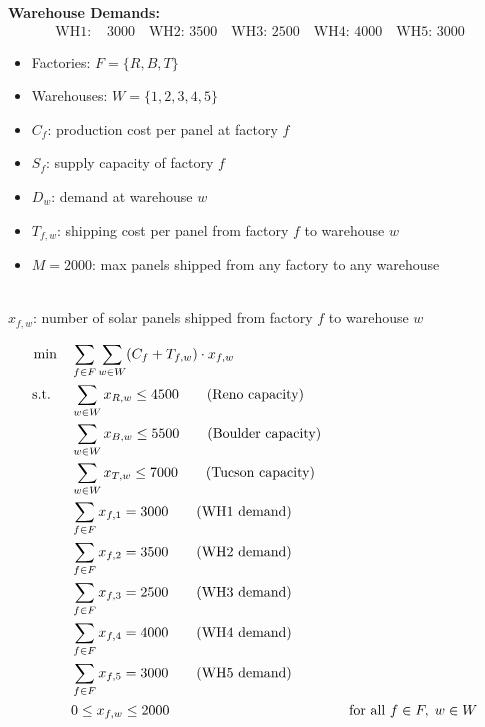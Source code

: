 \textbf{Warehouse Demands:}
\[
\begin{aligned}
\text{WH1: } & 3000 \quad \text{WH2: } 3500 \quad \text{WH3: } 2500 \quad \text{WH4: } 4000 \quad \text{WH5: } 3000
\end{aligned}
\]

\begin{solution}

\smallskip {}
\begin{itemize}
\item Factories: \( F = \{R, B, T\} \)
\item Warehouses: \( W = \{1, 2, 3, 4, 5\} \)
\end{itemize}

\smallskip {}
\begin{itemize}
\item \( C_f \): production cost per panel at factory \( f \)
\item \( S_f \): supply capacity of factory \( f \)
\item \( D_w \): demand at warehouse \( w \)
\item \( T_{f,w} \): shipping cost per panel from factory \( f \) to warehouse \( w \)
\item \( M = 2000 \): max panels shipped from any factory to any warehouse
\end{itemize}

\smallskip {} \\
\( x_{f,w} \): number of solar panels shipped from factory \( f \) to warehouse \( w \)

\smallskip {}
\begin{align*}
\min \quad & \sum_{f \in F} \sum_{w \in W} (C_f + T_{f,w}) \cdot x_{f,w} \\
\text{ s.t. } \quad 
& \sum_{w \in W} x_{R,w} \leq 4500   \tag{Reno capacity} \\
& \sum_{w \in W} x_{B,w} \leq 5500   \tag{Boulder capacity} \\
& \sum_{w \in W} x_{T,w} \leq 7000   \tag{Tucson capacity} \\
& \sum_{f \in F} x_{f,1} = 3000   \tag{WH1 demand} \\
& \sum_{f \in F} x_{f,2} = 3500   \tag{WH2 demand} \\
& \sum_{f \in F} x_{f,3} = 2500   \tag{WH3 demand} \\
& \sum_{f \in F} x_{f,4} = 4000   \tag{WH4 demand} \\
& \sum_{f \in F} x_{f,5} = 3000   \tag{WH5 demand} \\
& 0 \leq x_{f,w} \leq 2000 &&\quad \text{for all } f \in F,\; w \in W \\
\end{align*}

\end{solution}

